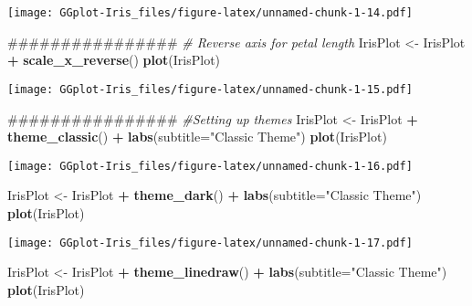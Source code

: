 \documentclass[]{article}
\newenvironment{Shaded}{\begin{snugshade}}{\end{snugshade}}
\newcommand{\KeywordTok}[1]{\textcolor[rgb]{0.13,0.29,0.53}{\textbf{#1}}}
\newcommand{\DataTypeTok}[1]{\textcolor[rgb]{0.13,0.29,0.53}{#1}}
\newcommand{\StringTok}[1]{\textcolor[rgb]{0.31,0.60,0.02}{#1}}
\newcommand{\CommentTok}[1]{\textcolor[rgb]{0.56,0.35,0.01}{\textit{#1}}}
\newcommand{\OperatorTok}[1]{\textcolor[rgb]{0.81,0.36,0.00}{\textbf{#1}}}
\newcommand{\NormalTok}[1]{#1}
\begin{document}
\texttt{[image: GGplot-Iris\_files/figure-latex/unnamed-chunk-1-14.pdf]}

\begin{Shaded}
\begin{Highlighting}[]
\NormalTok{################}
\CommentTok{# Reverse axis for petal length}
\NormalTok{IrisPlot  <-}\StringTok{ }\NormalTok{IrisPlot  }\OperatorTok{+}\StringTok{ }\KeywordTok{scale_x_reverse}\NormalTok{()}
\KeywordTok{plot}\NormalTok{(IrisPlot)}
\end{Highlighting}
\end{Shaded}

\texttt{[image: GGplot-Iris\_files/figure-latex/unnamed-chunk-1-15.pdf]}

\begin{Shaded}
\begin{Highlighting}[]
\NormalTok{################}
\CommentTok{#Setting up themes}
\NormalTok{IrisPlot <-}\StringTok{ }\NormalTok{IrisPlot  }\OperatorTok{+}\StringTok{ }\KeywordTok{theme_classic}\NormalTok{() }\OperatorTok{+}\StringTok{ }\KeywordTok{labs}\NormalTok{(}\DataTypeTok{subtitle=}\StringTok{"Classic Theme"}\NormalTok{)}
\KeywordTok{plot}\NormalTok{(IrisPlot)}
\end{Highlighting}
\end{Shaded}

\texttt{[image: GGplot-Iris\_files/figure-latex/unnamed-chunk-1-16.pdf]}

\begin{Shaded}
\begin{Highlighting}[]
\NormalTok{IrisPlot <-}\StringTok{ }\NormalTok{IrisPlot  }\OperatorTok{+}\StringTok{ }\KeywordTok{theme_dark}\NormalTok{() }\OperatorTok{+}\StringTok{ }\KeywordTok{labs}\NormalTok{(}\DataTypeTok{subtitle=}\StringTok{"Classic Theme"}\NormalTok{)}
\KeywordTok{plot}\NormalTok{(IrisPlot)}
\end{Highlighting}
\end{Shaded}

\texttt{[image: GGplot-Iris\_files/figure-latex/unnamed-chunk-1-17.pdf]}

\begin{Shaded}
\begin{Highlighting}[]
\NormalTok{IrisPlot <-}\StringTok{ }\NormalTok{IrisPlot  }\OperatorTok{+}\StringTok{ }\KeywordTok{theme_linedraw}\NormalTok{() }\OperatorTok{+}\StringTok{ }\KeywordTok{labs}\NormalTok{(}\DataTypeTok{subtitle=}\StringTok{"Classic Theme"}\NormalTok{)}
\KeywordTok{plot}\NormalTok{(IrisPlot)}
\end{Highlighting}
\end{Shaded}
\end{document}
